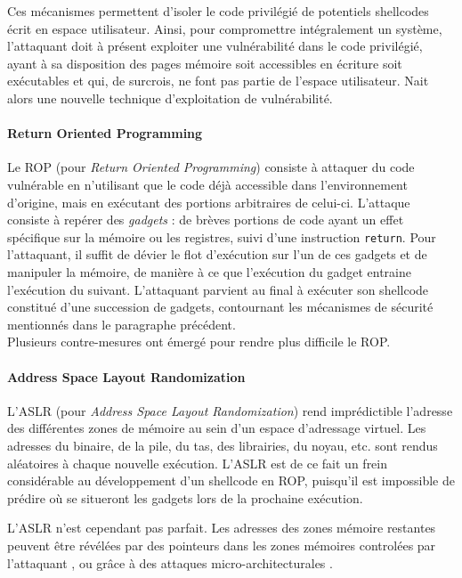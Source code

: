 Ces mécanismes permettent d'isoler le code privilégié de potentiels shellcodes écrit en espace utilisateur. Ainsi, pour compromettre intégralement un système, l'attaquant doit à présent exploiter une vulnérabilité dans le code privilégié, ayant à sa disposition des pages mémoire soit accessibles en écriture soit exécutables et qui, de surcrois, ne font pas partie de l'espace utilisateur.
Nait alors une nouvelle technique d'exploitation de vulnérabilité. 

\paragraph{Return Oriented Programming}
\label{ROP}
Le ROP (pour \emph{Return Oriented Programming}) consiste à attaquer du code vulnérable en n'utilisant que le code déjà accessible dans l'environnement d'origine, mais en exécutant des portions arbitraires de celui-ci. L'attaque consiste à repérer des \emph{gadgets} : de brèves portions de code ayant un effet spécifique sur la mémoire ou les registres, suivi d'une instruction \texttt{return}. Pour l'attaquant, il suffit de dévier le flot d'exécution sur l'un de ces gadgets et de manipuler la mémoire, de manière à ce que l'exécution du gadget entraine l'exécution du suivant. L'attaquant parvient au final à exécuter son shellcode constitué d'une succession de gadgets, contournant les mécanismes de sécurité mentionnés dans le paragraphe précédent.\\

Plusieurs contre-mesures ont émergé pour rendre plus difficile le ROP.

\paragraph{Address Space Layout Randomization}
\label{aslr}
L'ASLR (pour \emph{Address Space Layout Randomization}) rend imprédictible l'adresse des différentes zones de mémoire au sein d'un espace d'adressage virtuel. Les adresses du binaire, de la pile, du tas, des librairies, du noyau, etc. sont rendus aléatoires à chaque nouvelle exécution. L'ASLR est de ce fait un frein considérable au développement d'un shellcode en ROP, puisqu'il est impossible de prédire où se situeront les gadgets lors de la prochaine exécution.

L'ASLR n'est cependant pas parfait. Les adresses des zones mémoire restantes peuvent être révélées par des pointeurs dans les zones mémoires controlées par l'attaquant \cite{bypasskaslr}, ou grâce à des attaques micro-architecturales \cite{kaslrbypass, microarchitecturalbypass}.

